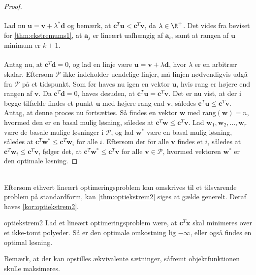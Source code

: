 \begin{proof}
\\\\%
Lad nu $\textbf{u} = \textbf{v} + \lambda^* \textbf{d} $ og bemærk, at $ \textbf{c}^T \textbf{u} < \textbf{c}^T \textbf{v}$, da $ \lambda \in \R^+ $. 
Det vides fra beviset for \ref{thm:ekstremums1}, at $\textbf{a}_j$ er lineært uafhængig af $\textbf{a}_i$, samt at rangen af $\textbf{u}$ minimum er $k + 1$. 
\\\\
%
Antag nu, at $\textbf{c}^T \textbf{d} = 0$, og lad en linje være $\textbf{u} = \textbf{v} + \lambda \textbf{d}$, hvor $ \lambda $ er en arbitrær skalar. 
Eftersom $\mathcal{P}$ ikke indeholder uendelige linjer, må linjen nødvendigvis udgå fra $\mathcal{P}$ på et tidspunkt. 
Som før haves nu igen en vektor $\textbf{u}$, hvis rang er højere end rangen af $\textbf{v}$. 
Da $\textbf{c}^T \textbf{d} = 0$, haves desuden, at $\textbf{c}^T \textbf{u} = \textbf{c}^T \textbf{v}$. 
Det er nu vist, at der i begge tilfælde findes et punkt $\textbf{u}$ med højere rang end $\textbf{v}$, således $\textbf{c}^T \textbf{u} \leq \textbf{c}^T \textbf{v}$. 
Antag, at denne proces nu fortsættes.
Så findes en vektor $\textbf{w}$ med rang$(\textbf{w})=n$, hvormed den er en basal mulig løsning, således at $\textbf{c}^T \textbf{w} \leq \textbf{c}^T \textbf{v}$. 
Lad $\textbf{w}_1, \textbf{w}_2, \ldots , \textbf{w}_r$ være de basale mulige løsninger i $\mathcal{P}$, og lad $\textbf{w}^*$ være en basal mulig løsning, således at $\textbf{c}^T \textbf{w}^* \leq \textbf{c}^T \textbf{w}_i$ for alle $i$. 
Eftersom der for alle $\textbf{v}$ findes et $i$, således at $\textbf{c}^T \textbf{w}_i \leq \textbf{c}^T \textbf{v}$, følger det, at $\textbf{c}^T \textbf{w}^* \leq \textbf{c}^T \textbf{v}$ for alle $\textbf{v} \in \mathcal{P}$, hvormed vektoren $\textbf{w}^*$ er den optimale løsning. 
\end{proof}
\\
%
Eftersom ethvert lineært optimeringsproblem kan omskrives til et tilsvarende problem på standardform, kan \ref{thm:optiekstrem2} siges at gælde generelt. 
Deraf haves \ref{kor:optiekstrem2}. 
%
\begin{kor}{}{optiekstrem2}
Lad et lineært optimeringsproblem være, at $\textbf{c}^T \textbf{x}$ skal minimeres over et ikke-tomt polyeder.
Så er den optimale omkostning lig $- \infty$, eller også findes en optimal løsning. 
\end{kor}
\noindent
%
Bemærk, at der kan opstilles ækvivalente sætninger, såfremt objektfunktionen skulle maksimeres.